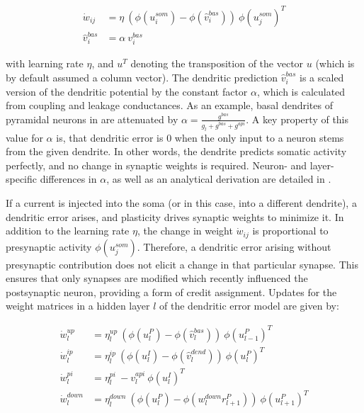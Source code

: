 \begin{align}
  \dot{w}_{ij}    & = \eta \ ( \phi(u_i^{som}) - \phi(\hat{v}_i^{bas}) ) \ \phi(u_j^{som})^T \\
  \hat{v}_i^{bas} & = \alpha \  v_i^{bas}
\end{align}

with learning rate $\eta$, and $u^T$ denoting the transposition of the vector $u$ (which is by default assumed a column
vector). The dendritic prediction $\hat{v}_i^{bas}$ is a scaled version of the dendritic potential by the constant
factor $\alpha$, which is calculated from coupling and leakage conductances. As an example, basal dendrites of pyramidal
neurons in \cite{sacramento2018dendritic} are attenuated by $\alpha = \frac{g^{bas}}{g_l + g^{bas} + g^{api}}$. A key
property of this value for $\alpha$ is, that dendritic error is $0$ when the only input to a neuron stems from the given
dendrite. In other words, the dendrite predicts somatic activity perfectly, and no change in synaptic weights is
required. Neuron- and layer-specific differences in $\alpha$, as well as an analytical derivation are detailed in
\citep{sacramento2018dendritic}.

If a current is injected into the soma (or in this case, into a different dendrite), a dendritic error arises, and
plasticity drives synaptic weights to minimize it. In addition to the learning rate $\eta$, the change in weight
$\dot{w}_{ij}$ is proportional to presynaptic activity $\phi(u_j^{som})$. Therefore, a dendritic error arising without
presynaptic contribution does not elicit a change in that particular synapse. This ensures that only synapses are
modified which recently influenced the postsynaptic neuron, providing a form of credit assignment. Updates for the
weight matrices in a hidden layer $l$ of the dendritic error model are given by:

\begin{align}
  \dot{w}_{l}^{up}   & = \eta_l^{up} \ ( \phi(u_l^{P}) - \phi(\hat{v}_l^{bas}) ) \ \phi(u_{l-1}^{P})^T\label{eq-delta_w_up}         \\
  \dot{w}_{l}^{ip}   & = \eta_l^{ip} \ ( \phi(u_l^{I}) - \phi(\hat{v}_l^{dend}) ) \ \phi(u_{l}^{P})^T\label{eq-delta_w_ip}          \\
  \dot{w}_{l}^{pi}   & = \eta_l^{pi} \ - v_l^{api} \ \phi(u_l^{I})^T\label{eq-delta_w_pi}                                           \\
  \dot{w}_{l}^{down} & = \eta_l^{down} \ ( \phi(u_l^{P}) - \phi(w_l^{down} r_{l+1}^P) )\ \phi(u_{l+1}^{P})^T\label{eq-delta_w_down}
\end{align}

